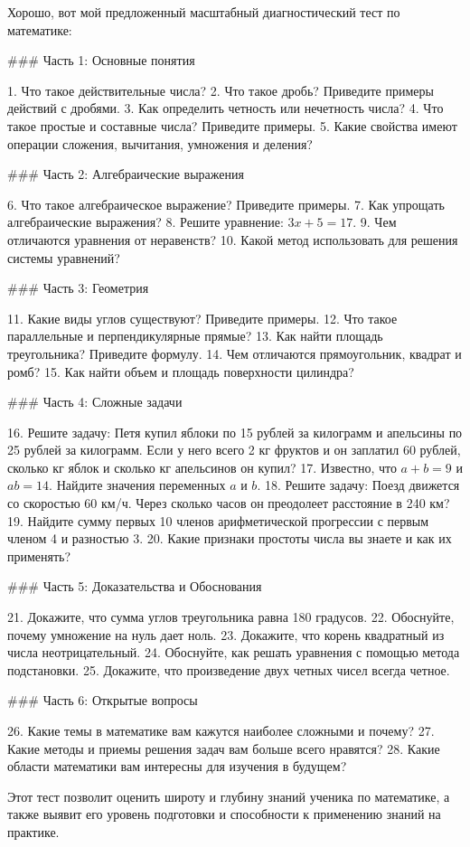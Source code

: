 \documentclass{article}
\begin{document}
Хорошо, вот мой предложенный масштабный диагностический тест по математике:

### Часть 1: Основные понятия

1. Что такое действительные числа?
2. Что такое дробь? Приведите примеры действий с дробями.
3. Как определить четность или нечетность числа?
4. Что такое простые и составные числа? Приведите примеры.
5. Какие свойства имеют операции сложения, вычитания, умножения и деления?

### Часть 2: Алгебраические выражения

6. Что такое алгебраическое выражение? Приведите примеры.
7. Как упрощать алгебраические выражения?
8. Решите уравнение: \(3x + 5 = 17\).
9. Чем отличаются уравнения от неравенств?
10. Какой метод использовать для решения системы уравнений?

### Часть 3: Геометрия

11. Какие виды углов существуют? Приведите примеры.
12. Что такое параллельные и перпендикулярные прямые?
13. Как найти площадь треугольника? Приведите формулу.
14. Чем отличаются прямоугольник, квадрат и ромб?
15. Как найти объем и площадь поверхности цилиндра?

### Часть 4: Сложные задачи

16. Решите задачу: Петя купил яблоки по 15 рублей за килограмм и апельсины по 25 рублей за килограмм. Если у него всего 2 кг фруктов и он заплатил 60 рублей, сколько кг яблок и сколько кг апельсинов он купил?
17. Известно, что \(a + b = 9\) и \(ab = 14\). Найдите значения переменных \(a\) и \(b\).
18. Решите задачу: Поезд движется со скоростью 60 км/ч. Через сколько часов он преодолеет расстояние в 240 км?
19. Найдите сумму первых 10 членов арифметической прогрессии с первым членом 4 и разностью 3.
20. Какие признаки простоты числа вы знаете и как их применять?

### Часть 5: Доказательства и Обоснования

21. Докажите, что сумма углов треугольника равна 180 градусов.
22. Обоснуйте, почему умножение на нуль дает ноль.
23. Докажите, что корень квадратный из числа неотрицательный.
24. Обоснуйте, как решать уравнения с помощью метода подстановки.
25. Докажите, что произведение двух четных чисел всегда четное.

### Часть 6: Открытые вопросы

26. Какие темы в математике вам кажутся наиболее сложными и почему?
27. Какие методы и приемы решения задач вам больше всего нравятся?
28. Какие области математики вам интересны для изучения в будущем?

Этот тест позволит оценить широту и глубину знаний ученика по математике, а также выявит его уровень подготовки и способности к применению знаний на практике.
\end{document}
